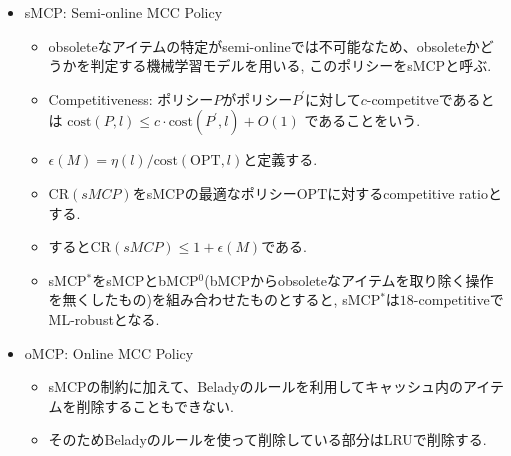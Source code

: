 \documentclass[dvipdfmx,uplatex]{jsarticle}
\theoremstyle{remark}
\newenvironment{method}[1]{
    \begin{tcolorbox}[
        colframe=green!50!black,
        colback=green!50!black!10!white,
        colbacktitle=green!50!black!40!white,
        coltitle=black,
        fonttitle=\bfseries,
        title={#1}
    ]
}{
    \end{tcolorbox}
}
\begin{document}
\begin{method}{Online MCC Policy}
\begin{itemize}
    \item sMCP: Semi-online MCC Policy
    \begin{itemize}
        \item obsoleteなアイテムの特定がsemi-onlineでは不可能なため、obsoleteかどうかを判定する機械学習モデルを用いる, このポリシーをsMCPと呼ぶ.
        \item Competitiveness: ポリシー$P$がポリシー$P^\prime$に対して$c$-competitveであるとは $\mathrm{cost}(P,l) \leq c\cdot \mathrm{cost}(P^\prime,l) + O(1)$ であることをいう.
        \item $\epsilon(M) = \eta(l)/\mathrm{cost}(\mathrm{OPT}, l)$と定義する.
        \item $\mathrm{CR}(sMCP)$をsMCPの最適なポリシー$\mathrm{OPT}$に対するcompetitive ratioとする.
        \item すると$\mathrm{CR}(sMCP) \leq 1 + \epsilon(M)$である.
        \item sMCP${}^*$をsMCPとbMCP${}^0$(bMCPからobsoleteなアイテムを取り除く操作を無くしたもの)を組み合わせたものとすると, sMCP${}^*$は$18$-competitiveでML-robustとなる.
    \end{itemize}
    \item oMCP: Online MCC Policy
    \begin{itemize}
        \item sMCPの制約に加えて、Beladyのルールを利用してキャッシュ内のアイテムを削除することもできない.
        \item そのためBeladyのルールを使って削除している部分はLRUで削除する.
    \end{itemize}
\end{itemize}
\end{method}
\end{document}
